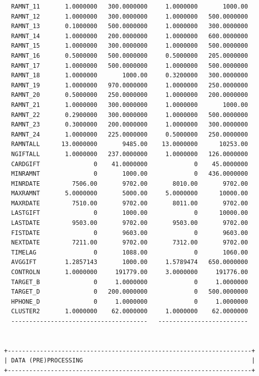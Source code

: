 \documentclass[
  11pt,
  a4paper,
  DIV=12,captions=tableheading,oneside,titlepage]{scrbook}
\begin{document}
\begin{verbatim}
  RAMNT_11       1.0000000   300.0000000     1.0000000       1000.00 
  RAMNT_12       1.0000000   300.0000000     1.0000000   500.0000000 
  RAMNT_13       0.1000000   500.0000000     1.0000000   300.0000000 
  RAMNT_14       1.0000000   200.0000000     1.0000000   600.0000000 
  RAMNT_15       1.0000000   300.0000000     1.0000000   500.0000000 
  RAMNT_16       0.5000000   500.0000000     0.5000000   205.0000000 
  RAMNT_17       1.0000000   500.0000000     1.0000000   500.0000000 
  RAMNT_18       1.0000000       1000.00     0.3200000   300.0000000 
  RAMNT_19       1.0000000   970.0000000     1.0000000   250.0000000 
  RAMNT_20       0.5000000   250.0000000     1.0000000   200.0000000 
  RAMNT_21       1.0000000   300.0000000     1.0000000       1000.00 
  RAMNT_22       0.2900000   300.0000000     1.0000000   500.0000000 
  RAMNT_23       0.3000000   200.0000000     1.0000000   300.0000000 
  RAMNT_24       1.0000000   225.0000000     0.5000000   250.0000000 
  RAMNTALL      13.0000000       9485.00    13.0000000      10253.00 
  NGIFTALL       1.0000000   237.0000000     1.0000000   126.0000000 
  CARDGIFT               0    41.0000000             0    45.0000000 
  MINRAMNT               0       1000.00             0   436.0000000 
  MINRDATE         7506.00       9702.00       8010.00       9702.00 
  MAXRAMNT       5.0000000       5000.00     5.0000000      10000.00 
  MAXRDATE         7510.00       9702.00       8011.00       9702.00 
  LASTGIFT               0       1000.00             0      10000.00 
  LASTDATE         9503.00       9702.00       9503.00       9702.00 
  FISTDATE               0       9603.00             0       9603.00 
  NEXTDATE         7211.00       9702.00       7312.00       9702.00 
  TIMELAG                0       1088.00             0       1060.00 
  AVGGIFT        1.2857143       1000.00     1.5789474   650.0000000 
  CONTROLN       1.0000000     191779.00     3.0000000     191776.00 
  TARGET_B               0     1.0000000             0     1.0000000 
  TARGET_D               0   200.0000000             0   500.0000000 
  HPHONE_D               0     1.0000000             0     1.0000000 
  CLUSTER2       1.0000000    62.0000000     1.0000000    62.0000000
  --------------------------------------   -------------------------

        
+--------------------------------------------------------------------+
| DATA (PRE)PROCESSING                                               |
+--------------------------------------------------------------------+


\end{verbatim}
\end{document}
